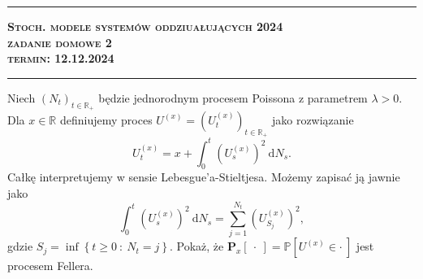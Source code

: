 \documentclass[a4paper, 12pt]{article}
\begin{document}
\begin{center}
\par\noindent\rule{\textwidth}{0.4pt}
	{\large \bf
\textsc{ Stoch. modele systemów oddziuałujących 2024}\\
\textsc{zadanie domowe 2} \\
\textsc{termin: 12.12.2024} }
\par\noindent\rule{\textwidth}{0.4pt}
\end{center}
Niech $(N_t)_{t \in \mathbb{R}_+}$ będzie jednorodnym procesem Poissona z parametrem $\lambda>0$. Dla
$x \in \mathbb{R}$ definiujemy proces $U^{(x)}=(U^{(x)}_t)_{t \in \mathbb{R}_+}$ jako rozwiązanie
\begin{equation*}
	U_t^{(x)} = x + \int_0^t \left( U_s^{(x)} \right)^2 \: \mathrm{d} N_s.
\end{equation*}
Całkę interpretujemy w sensie Lebesgue’a-Stieltjesa. 
Możemy zapisać ją jawnie jako
\begin{equation*}
	\int_0^t \left( U_s^{(x)} \right)^2 \: \mathrm{d} N_s 
	= \sum_{j=1}^{N_t} \left( U_{S_j}^{(x)}\right)^2,
\end{equation*}
gdzie $S_j = \inf \left\{ t\geq 0 \: : \: N_t=j  \right\}$.
Pokaż, że $ \mathbf{P}_x[ \: \cdot \: ] = \mathbb{P} [U^{(x)} \in \cdot \: ]$ jest procesem Fellera.
\end{document}
